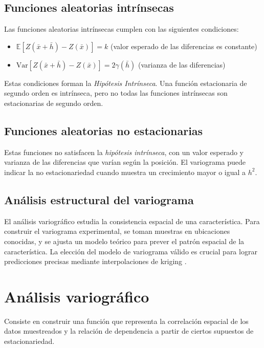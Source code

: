 \subsection{Funciones aleatorias intrínsecas}

Las funciones aleatorias intrínsecas cumplen con las siguientes condiciones:

\begin{itemize}
    \item \( \mathbb{E}[Z(\bar{x}+\bar{h})-Z(\bar{x})] = k \) (valor esperado de las diferencias es constante)
    \item \( \text{Var}[Z(\bar{x}+\bar{h})-Z(\bar{x})] = 2\gamma(\bar{h}) \) (varianza de las diferencias)
\end{itemize}

Estas condiciones forman la \textit{Hipótesis Intrínseca}. Una función estacionaria de segundo orden es intrínseca, pero no todas las funciones intrínsecas son estacionarias de segundo orden.

\subsection{Funciones aleatorias no estacionarias}

Estas funciones no satisfacen la \textit{hipótesis intrínseca}, con un valor esperado y varianza de las diferencias que varían según la posición. El variograma puede indicar la no estacionariedad cuando muestra un crecimiento mayor o igual a \(h^2\).

\subsection{Análisis estructural del variograma}

El análisis variográfico estudia la consistencia espacial de una característica. Para construir el variograma experimental, se toman muestras en ubicaciones conocidas, y se ajusta un modelo teórico para prever el patrón espacial de la característica. La elección del modelo de variograma válido es crucial para lograr predicciones precisas mediante interpolaciones de kriging \cite{Mahdi2020}.


\section{Análisis variográfico }

Consiste en construir una función que representa la correlación espacial de los datos muestreados y la relación de dependencia a partir de ciertos supuestos de estacionariedad.
